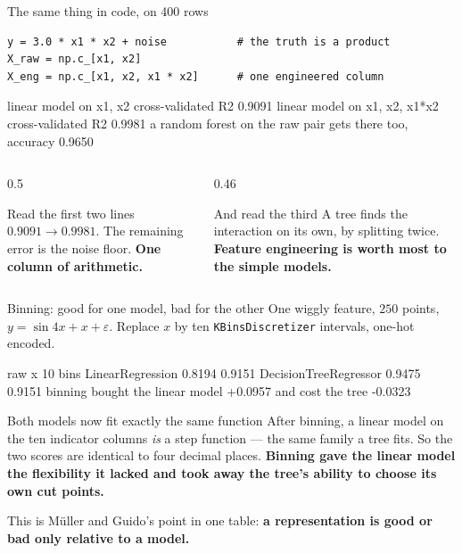 \documentclass[aspectratio=169]{beamer}
\begin{document}
\begin{frame}[fragile,shrink=4]{The same thing in code, on 400 rows}
\begin{lstlisting}
y = 3.0 * x1 * x2 + noise           # the truth is a product
X_raw = np.c_[x1, x2]
X_eng = np.c_[x1, x2, x1 * x2]      # one engineered column
\end{lstlisting}
\begin{outblk}
linear model on x1, x2          cross-validated R2 0.9091
linear model on x1, x2, x1*x2   cross-validated R2 0.9981
a random forest on the raw pair gets there too, accuracy 0.9650
\end{outblk}
\begin{columns}[T]
  \begin{column}{0.5\textwidth}
    \begin{exampleblock}{Read the first two lines}
      \small $0.9091 \rightarrow 0.9981$. The remaining error is the noise
      floor. \textbf{One column of arithmetic.}
    \end{exampleblock}
  \end{column}
  \begin{column}{0.46\textwidth}
    \begin{alertblock}{And read the third}
      \small A tree finds the interaction on its own, by splitting twice.
      \textbf{Feature engineering is worth most to the simple models.}
    \end{alertblock}
  \end{column}
\end{columns}
\end{frame}

\begin{frame}[fragile,shrink=6]{Binning: good for one model, bad for the other}
One wiggly feature, $250$ points, $y = \sin 4x + x + \varepsilon$. Replace $x$
by ten \texttt{KBinsDiscretizer} intervals, one-hot encoded.
\begin{outblk}
                            raw x    10 bins
LinearRegression           0.8194     0.9151
DecisionTreeRegressor      0.9475     0.9151
binning bought the linear model +0.0957 and cost the tree -0.0323
\end{outblk}
\begin{alertblock}{Both models now fit exactly the same function}
  \footnotesize After binning, a linear model on the ten indicator columns
  \emph{is} a step function --- the same family a tree fits. So the two scores
  are identical to four decimal places. \textbf{Binning gave the linear model
  the flexibility it lacked and took away the tree's ability to choose its own
  cut points.}
\end{alertblock}
\begin{center}\small
  This is Müller and Guido's point in one table: \textbf{a representation is
  good or bad only relative to a model.}
\end{center}
\end{frame}
\end{document}
